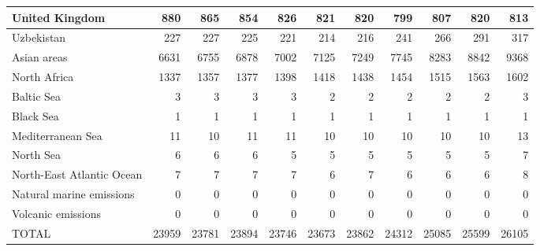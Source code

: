 \begin{table}
\begin{tabular}{|l|r|r|r|r|r|r|r|r|r|r|}
                United Kingdom&    880&    865&    854&    826&    821&    820&    799&    807&    820&    813\\\hline
                    Uzbekistan&    227&    227&    225&    221&    214&    216&    241&    266&    291&    317\\\hline
                   Asian areas&   6631&   6755&   6878&   7002&   7125&   7249&   7745&   8283&   8842&   9368\\\hline
                  North Africa&   1337&   1357&   1377&   1398&   1418&   1438&   1454&   1515&   1563&   1602\\\hline
                    Baltic Sea&      3&      3&      3&      3&      2&      2&      2&      2&      2&      3\\\hline
                     Black Sea&      1&      1&      1&      1&      1&      1&      1&      1&      1&      1\\\hline
             Mediterranean Sea&     11&     10&     11&     11&     10&     10&     10&     10&     10&     13\\\hline
                     North Sea&      6&      6&      6&      5&      5&      5&      5&      5&      5&      7\\\hline
     North-East Atlantic Ocean&      7&      7&      7&      7&      6&      7&      6&      6&      6&      8\\\hline
      Natural marine emissions&      0&      0&      0&      0&      0&      0&      0&      0&      0&      0\\\hline
            Volcanic emissions&      0&      0&      0&      0&      0&      0&      0&      0&      0&      0\\\hline\hline
                         TOTAL&  23959&  23781&  23894&  23746&  23673&  23862&  24312&  25085&  25599&  26105\\\hline
 \end{tabular}
 \end{table}
 
